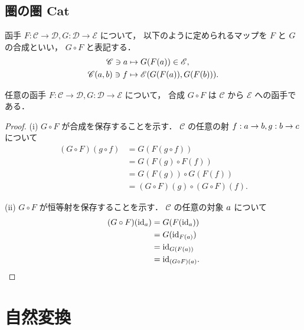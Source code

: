\documentclass[titlepage]{ltjsreport}
\newcommand{\cat}[1]{\mathscr{#1}}
\newcommand{\obj}[1]{\lowercase{#1}}
\newcommand{\mrp}[3]{{#1}:{#2}\to{#3}}
\newcommand{\mrps}[3]{#1(#2,#3)}
\newcommand{\id}[1]{\mathrm{id}_{#1}}
\newcommand{\Cat}{\mathbf{Cat}}
\begin{document}
{

\subsection{圏の圏 $\Cat$}

\def\C{\cat{C}}%
\def\D{\cat{D}}%
\def\E{\cat{E}}%
\def\F{F}%
\def\G{G}%
\def\a{\obj{a}}%
\def\b{\obj{b}}%
\def\c{\obj{c}}%
\def\f{f}%
\def\g{g}%

\begin{definition}[函手の合成]
  函手 $\mrp{\F}{\C}{\D},\mrp{\G}{\D}{\E}$ について，
  以下のように定められるマップを $\F$ と $\G$ の合成といい，
  $\G\circ\F$ と表記する．
  \begin{align}
    \C\ni\a                & \mapsto\G(\F(\a))\in\E,                  \\
    \mrps{\C}{\a}{\b}\ni\f & \mapsto\mrps{\E}{\G(\F(a))}{\G(\F(\b))}.
  \end{align}
\end{definition}

\begin{theorem}
  任意の函手 $\mrp{\F}{\C}{\D},\mrp{\G}{\D}{\E}$ について，
  合成 $\G\circ\F$ は $\C$ から $\E$ への函手である．
\end{theorem}

\begin{proof}
  (i) $\G\circ\F$ が合成を保存することを示す．
  $\C$ の任意の射 $\mrp{\f}{\a}{\b},\mrp{\g}{\b}{\c}$ について
  \begin{align*}
    (\G\circ\F)(\g\circ\f)
     & =\G(\F(\g\circ\f))                    \\
     & =\G(\F(\g)\circ\F(\f))                \\
     & =\G(\F(\g))\circ\G(\F(\f))            \\
     & =(\G\circ\F)(\g)\circ(\G\circ\F)(\f).
  \end{align*}

  (ii) $\G\circ\F$ が恒等射を保存することを示す．
  $\C$ の任意の対象 $\a$ について
  \begin{align*}
    (\G\circ\F)(\id{\a})
     & =\G(\F(\id{\a}))       \\
     & =\G(\id{\F(\a)})       \\
     & =\id{\G(\F(\a))}       \\
     & =\id{(\G\circ\F)(\a)}.
  \end{align*}
\end{proof}

}

\section{自然変換}
\end{document}
